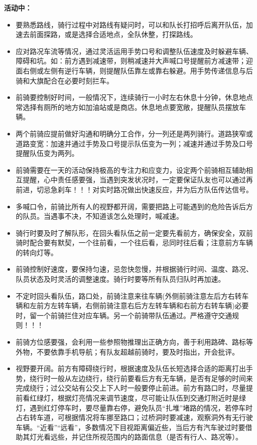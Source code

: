 \documentclass{ctexbook}
\begin{document}
\textbf{活动中：}
\begin{itemize}
\item 要熟悉路线，骑行过程中对路线有疑问时，可以和队长打招呼后离开队伍，加速去前面探路，或是选择合适地点，全队休整，打探路线。

\item 应对路况车流等情况，通过灵活运用手势口号和调整队伍速度及时躲避车辆、障碍和坑。如：前方遇到减速带，则稍减速并大声喊口号提醒前方减速带；迎面右侧或左侧有逆行车辆，则提醒队伍靠左或靠右躲避。用手势传递信息与后骑和大旗配合在必要时刻拦车。

\item 前骑要控制好时间，一般情况下，连续骑行一小时左右休息十分钟，休息地点常选择有厕所的地方如加油站或是商店。休息地点要宽敞，提醒队员摆放车辆。

\item 两个前骑应提前做好沟通和明确分工合作，分一列还是两列骑行。道路狭窄或道路变宽：加速并通过手势及口号提示队伍变为一列；减速并通过手势及口号提醒队伍变为两列。

\item 前骑需要在一天的活动保持极高的专注力和应变力，设定两个前骑相互辅助相互提醒，心中责任感要强，当遇到突发状况时，一定要保证队友也可以通过再前进，切忌急刹车！！！对实时路况做出快速反应，并为后方队伍传达信号。

\item 多喊口令，前骑比所有人的视野都开阔，需要把路上可能遇到的危险告诉后方的队员。当遇事不决，不知道该怎么处理时，喊减速。

\item 骑行时要及时了解队形，在回头看队伍之前一定要先看前方，确保安全，双前骑时配合要有默契，一个往前看，一个往后看，忌同时往后看；注意前方车辆的转向灯等。

\item 前骑控制好速度，要保持匀速，忌忽快忽慢，并根据骑行时间、温度、路况、队员状态及时灵活的调整速度。骑行时要等所有队员归队时再加速。

\item 不定时回头看队伍，路口处，前骑注意来往车辆(外侧前骑注意左后方右转车辆和左前方左转车辆，右侧前骑注意右后方左转车辆和右前方右转车辆)必要时，留一个前骑拦住对应车辆。另一个前骑带队伍通过。严格遵守交通规则！！！

\item 前骑方位感要强，会利用一些参照物推理出正确方向，善于利用路碑、路标等外物，不要依靠手机导航；有队友超越前骑时，要及时指出，开会批评。

\item 视野要开阔。前方有障碍绕行时，根据速度及队伍长短选择合适的距离打出手势，绕行时一般从左边绕行，绕行前要看后方有无车辆，是否有足够的时间来完成绕行；过公交站有公交上下人时一般要停止前进。前方有路口时，尽量提前看红绿灯，根据灯亮情况来调节速度，尽可能让队伍到交通灯附近时是绿灯，遇到红灯停车时，要尽量靠右停，避免队员“扎堆”堵路的情况，若停车时占右转车道，可根据情况将车挪至路口；过桥洞时要减速，观察洞外有无行驶车辆。“近看”“远看”，多数情况下目视距离偏近些，当后方有汽车驶过时要借助其灯光看远些，并记住所视范围内的路面信息（是否有行人、路况等）。


\end{itemize}
\end{document}
